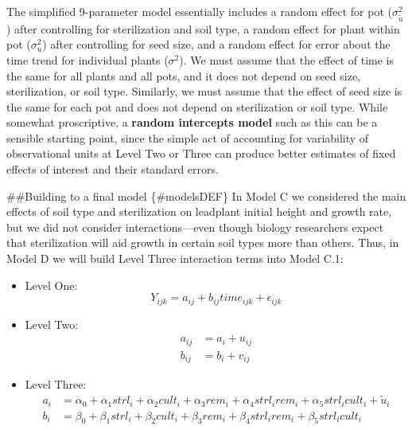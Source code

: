 \documentclass[
]{krantz}
\providecommand{\tightlist}{%
  \setlength{\itemsep}{0pt}\setlength{\parskip}{0pt}}
\begin{document}
The simplified 9-parameter model essentially includes a random effect for pot (\(\sigma_{\tilde{u}}^{2}\)) after controlling for sterilization and soil type, a random effect for plant within pot (\(\sigma_{u}^{2}\)) after controlling for seed size, and a random effect for error about the time trend for individual plants (\(\sigma^{2}\)). We must assume that the effect of time is the same for all plants and all pots, and it does not depend on seed size, sterilization, or soil type. Similarly, we must assume that the effect of seed size is the same for each pot and does not depend on sterilization or soil type. While somewhat proscriptive, a \textbf{random intercepts model} such as this can be a sensible starting point, since the simple act of accounting for variability of observational units at Level Two or Three can produce better estimates of fixed effects of interest and their standard errors.

\#\#Building to a final model \{\#modelsDEF\}
In Model C we considered the main effects of soil type and sterilization on leadplant initial height and growth rate, but we did not consider interactions---even though biology researchers expect that sterilization will aid growth in certain soil types more than others. Thus, in Model D we will build Level Three interaction terms into Model C.1:

\begin{itemize}
\tightlist
\item
  Level One:
  \begin{equation}
  Y_{ijk} = a_{ij}+b_{ij}\textstyle{time}_{ijk}+\epsilon_{ijk}
  \end{equation}
\item
  Level Two:
  \begin{align*}
  a_{ij} & = a_{i}+u_{ij} \\
  b_{ij} & = b_{i}+v_{ij}
  \end{align*}
\item
  Level Three:
  \begin{align*}
  a_{i} & = \alpha_{0} + \alpha_{1}\textstyle{strl}_{i} + \alpha_{2}\textstyle{cult}_{i} + \alpha_{3}\textstyle{rem}_{i} + \alpha_{4}\textstyle{strl}_{i}\textstyle{rem}_{i} + \alpha_{5}\textstyle{strl}_{i}\textstyle{cult}_{i} + \tilde{u}_{i} \\
  b_{i} & = \beta_{0}+\beta_{1}\textstyle{strl}_{i}+\beta_{2}\textstyle{cult}_{i}+\beta_{3}\textstyle{rem}_{i} + \beta_{4}\textstyle{strl}_{i}\textstyle{rem}_{i} + \beta_{5}\textstyle{strl}_{i}\textstyle{cult}_{i}
  \end{align*}
\end{itemize}
\end{document}
